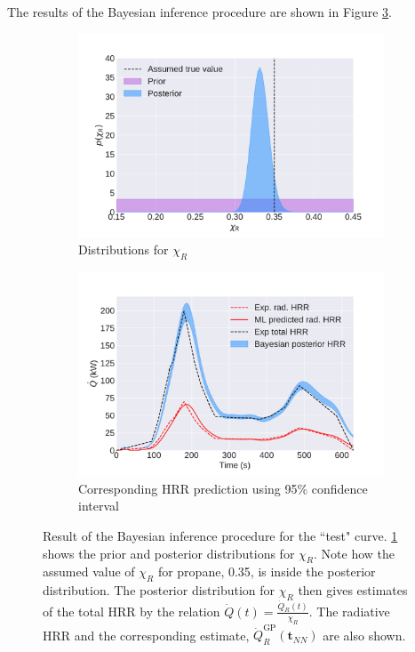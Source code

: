 \documentclass{article}
\begin{document}
The results of the Bayesian inference procedure are shown in Figure \ref{fig:bayes_result}. 


\begin{figure}[htbp]
  \centering
  \begin{subfigure}[t]{.45\textwidth}
      \centering
      \includegraphics[width=\textwidth,keepaspectratio]{figures/bayes_distributions.pdf}
      \caption{Distributions for $\chi_R$}
      \label{fig:bayes_distributions}
  \end{subfigure}
  \begin{subfigure}[t]{.45\textwidth}
      \centering
      \includegraphics[width=\textwidth ,keepaspectratio]{figures/bayes_burner_result.pdf}
      \caption{Corresponding HRR prediction using 95\% confidence interval}
      \label{fig:burner_result}
  \end{subfigure}
  \caption{Result of the Bayesian inference procedure for the ``test" curve. \protect\ref{fig:bayes_distributions} shows the prior and posterior distributions for $\chi_R$. Note how the assumed value of $\chi_R$ for propane, 0.35, is inside the posterior distribution. The posterior distribution for $\chi_R$ then gives estimates of the total HRR by the relation $\dot{Q}(t) = \frac{\dot{Q}_R(t)}{\chi_R}$. The radiative HRR and the corresponding estimate, $\dot{Q}^{\text{GP}}_R(\boldsymbol{t}_{NN})$ are also shown. }
  \label{fig:bayes_result}
\end{figure}
\end{document}
